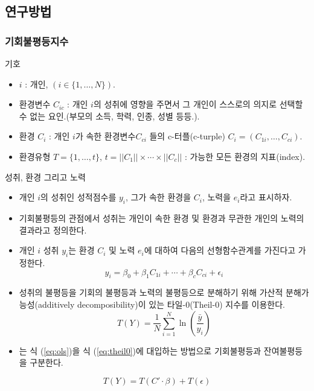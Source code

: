 \documentclass[aspectratio=169,xcolor=dvipsnames,handout]{beamer}
\begin{document}
\subsection{연구방법}
\subsubsection{기회불평등지수}
\begin{frame}{기호}
    \begin{itemize}
        \item  $i$ : 개인, $(i \in \{1,\ldots,N \} )$.
        \item 환경변수 $C_{ic}$ : 개인 $i$의 성취에 영향을 주면서 그 개인이 스스로의 의지로 선택할 수 없는 요인.(부모의 소득, 학력, 인종, 성별 등등.).
        \item 환경 $C_i$ : 개인 $i$가 속한 환경변수$C_{ci}$ 들의 c-터플(c-turple) $C_i = (C_{1i}, \ldots , C_{ci})$. 
        \item 환경유형 $T= \{1, \ldots , t \}$, $t= ||C_1|| \times \cdots \times ||C_c||$ : 가능한 모든 환경의 지표(index).
    \end{itemize}
\end{frame}

\begin{frame}{성취, 환경 그리고 노력}
    \begin{itemize}
        \item 개인 $i$의 성취인 성적점수를 $y_i$, 그가 속한 환경을 $C_i$, 노력을 $e_i$라고 표시하자.
        \item 기회불평등의 관점에서 성취는 개인이 속한 환경 및 환경과 무관한 개인의 노력의 결과라고 정의한다.
        \item 개인 $i$ 성취 $y_i$는 환경 $C_i$ 및 노력 $e_i$에 대하여 다음의 선형함수관계를 가진다고 가정한다.
        \begin{equation}
            \label{eq:ols}
             y_{i} =\beta _0 +  \beta _1 C_{1i} + \cdots + \beta _c C_{ci} + \epsilon _i
        \end{equation}
    \end{itemize}
\end{frame}

\begin{frame}{\cite{fng11}}
    \begin{itemize}
        \item 성취의 불평등을 기회의 불평등과 노력의 불평등으로 분해하기 위해 가산적 분해가능성(additively decomposibility)이 있는 타일-0(Theil-0) 지수를 이용한다.
        \begin{equation}
            \label{eq:theil0}
            T(Y)=\frac{1}{N} \sum_{i=1}^{N} \ln \left(\frac{\bar{y}}{y_{i}}\right)
        \end{equation} 
        \item \cite{fng11}는 식 (\ref{eq:ols})을 식 (\ref{eq:theil0})에 대입하는 방법으로 기회불평등과 잔여불평등을 구분한다.
    \end{itemize}
    \begin{equation}
        \label{eq:theil0-decompose}
        T(Y)=T(C ' \cdot \beta) + T(\epsilon)
    \end{equation}
\end{frame}
\end{document}
